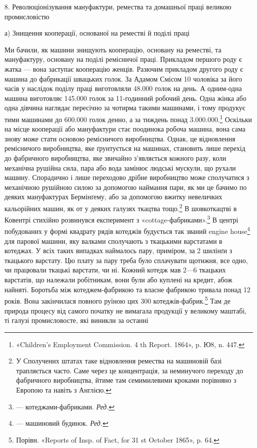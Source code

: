 8. Революціонізування мануфактури, ремества та домашньої
праці великою промисловістю

а) Знищення кооперації, основаної
на реместві й поділі праці

Ми бачили, як машини знищують кооперацію, основану на
реместві, та мануфактуру, основану на поділі ремісничої
праці. Прикладом першого роду є жатка — вона заступає кооперацію
женців. Разючим прикладом другого роду є машина до
фабрикації швацьких голок. За Адамом Смісом 10 чоловіка за
його часів у наслідок поділу праці виготовляли 48.000 голок на
день. А одним-одна машина виготовляє 145.000 голок за 11-годинний
робочий день. Одна жінка або одна дівчина наглядає
пересічно за чотирма такими машинами, і тому продукує тими
машинами до 600.000 голок денно, а за тиждень понад 3.000.000.\footnote{
«Children’s Employment Commission. 4 th Report. 1864», p. Ю8,
n. 447.
}
Оскільки на місце кооперації або мануфактури стає поодинока
робоча машина, вона сама знову може стати основою ремісничого
виробництва. Однак, це відновлення ремісничого виробництва,
яке ґрунтується на машинах, становить лише перехід до фабричного
виробництва, яке звичайно з’являється кожного разу, коли
механічна рушійна сила, пара або вода замінює людські мускули,
що рухали машину. Спорадично і лише переходово дрібне виробництво
може сполучатися з механічною рушійною силою за
допомогою наймання пари, як ми це бачимо по деяких мануфактурах
Бермінґему, або за допомогою вжитку невеличких кальорійних
машин, як от у деяких галузях ткацтва тощо.\footnote{
У Сполучених штатах таке відновлення ремества на машиновій
базі трапляється часто. Саме через це концентрація, за неминучого переходу
до фабричного виробництва, йтиме там семимилевими кроками порівняно
з Европою та навіть з Англією.
} В шовкоткацтві
в Ковентрі стихійно розвинувся експеримент з «cottage-фабриками».\footnote*{
— котеджами-фабриками. \emph{Ред.}
}
В центрі побудованих у формі квадрату рядів котеджів
будується так званий engine house\footnote*{
— машиновий будинок. \emph{Ред.}
} для парової машини,
яку валками сполучають з ткацькими варстатами в котеджах.
У всіх таких випадках наймалось пару, приміром, за 2 шилінґи
з ткацького варстату. Цю плату за пару треба було сплачувати
щотижня, все одно, чи працювали ткацькі варстати, чи ні. Кожний
котедж мав 2—6 ткацьких варстатів, що належали робітникам,
вони були або куплені на кредит, абож найняті. Боротьба між
котеджем-фабрикою та власне фабрикою тривала понад 12 років.
Вона закінчилася повного руїною цих 300 котеджів-фабрик.\footnote{
Порівн. «Reports of Insp. of Fact, for 31 st October 1865», p. 64.
} Там
де природа процесу від самого початку не вимагала продукції у великому
маштабі, ті галузі промисловосте, які виникли за останні